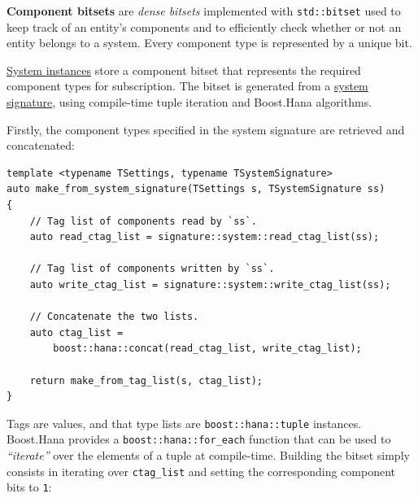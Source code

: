 \documentclass[twoside, 12pt, a4paper, openany]{book}
\begin{document}
\textbf{Component bitsets} are \emph{dense bitsets} implemented with
\texttt{std::bitset}
used to keep track of an entity's components and to efficiently check
whether or not an entity belongs to a system. Every component type is
represented by a unique bit.

\protect\hyperlink{storage_system}{System instances} store a component
bitset that represents the required component types for subscription.
The bitset is generated from a \protect\hyperlink{system_sigs}{system
signature}, using compile-time tuple iteration and Boost.Hana
algorithms.

Firstly, the component types specified in the system signature are
retrieved and concatenated:

\begin{verbatim}
template <typename TSettings, typename TSystemSignature>
auto make_from_system_signature(TSettings s, TSystemSignature ss)
{
    // Tag list of components read by `ss`.
    auto read_ctag_list = signature::system::read_ctag_list(ss);

    // Tag list of components written by `ss`.
    auto write_ctag_list = signature::system::write_ctag_list(ss);

    // Concatenate the two lists.
    auto ctag_list =
        boost::hana::concat(read_ctag_list, write_ctag_list);

    return make_from_tag_list(s, ctag_list);
}
\end{verbatim}

Tags are values, and that type lists are
\texttt{boost::hana::tuple}
instances. Boost.Hana provides a
\texttt{boost::hana::for_each}
function that can be used to \emph{``iterate''} over the elements of a
tuple at compile-time. Building the bitset simply consists in iterating
over
\texttt{ctag_list}
and setting the corresponding component bits to
\texttt{1}:
\end{document}
